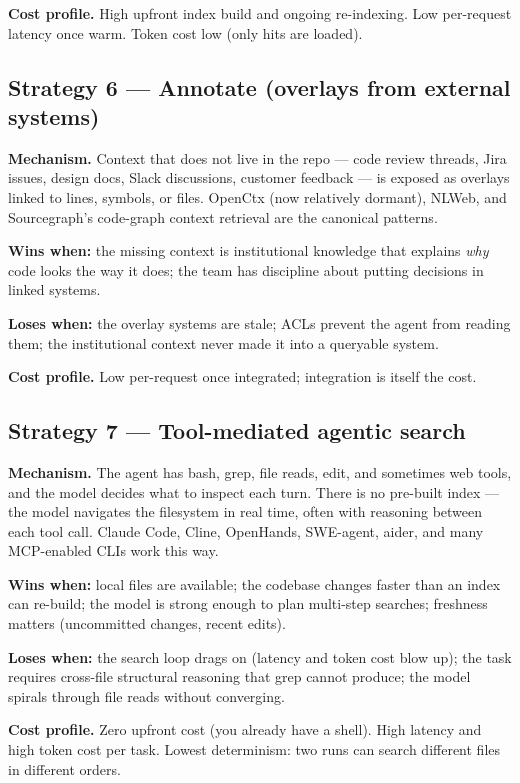 \documentclass[
  11pt,
  letterpaper,
  numbers=noendperiod,
  parskip=half]{scrartcl}
\begin{document}
\textbf{Cost profile.} High upfront index build and ongoing
re-indexing. Low per-request latency once warm. Token cost low (only
hits are loaded).

\subsection{Strategy 6 --- Annotate (overlays from external
systems)}\label{sec-strat-annotate}

\textbf{Mechanism.} Context that does not live in the repo --- code
review threads, Jira issues, design docs, Slack discussions, customer
feedback --- is exposed as overlays linked to lines, symbols, or files.
OpenCtx (now relatively dormant), NLWeb, and Sourcegraph's code-graph
context retrieval are the canonical patterns.

\textbf{Wins when:} the missing context is institutional knowledge that
explains \emph{why} code looks the way it does; the team has discipline
about putting decisions in linked systems.

\textbf{Loses when:} the overlay systems are stale; ACLs prevent the
agent from reading them; the institutional context never made it into a
queryable system.

\textbf{Cost profile.} Low per-request once integrated; integration is
itself the cost.

\subsection{Strategy 7 --- Tool-mediated agentic search}\label{sec-strat-agentic}

\textbf{Mechanism.} The agent has bash, grep, file reads, edit, and
sometimes web tools, and the model decides what to inspect each turn.
There is no pre-built index --- the model navigates the filesystem in
real time, often with reasoning between each tool call. Claude Code,
Cline, OpenHands, SWE-agent, aider, and many MCP-enabled CLIs work this
way.

\textbf{Wins when:} local files are available; the codebase changes
faster than an index can re-build; the model is strong enough to plan
multi-step searches; freshness matters (uncommitted changes, recent
edits).

\textbf{Loses when:} the search loop drags on (latency and token cost
blow up); the task requires cross-file structural reasoning that grep
cannot produce; the model spirals through file reads without
converging.

\textbf{Cost profile.} Zero upfront cost (you already have a shell).
High latency and high token cost per task. Lowest determinism: two
runs can search different files in different orders.
\end{document}
